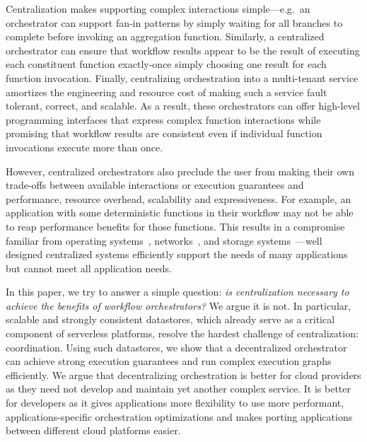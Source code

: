 Centralization makes supporting complex interactions simple---e.g.\ an
orchestrator can support fan-in patterns by simply waiting for all branches to
complete before invoking an aggregation function. Similarly, a centralized
orchestrator can ensure that workflow results appear to be the result of
executing each constituent function exactly-once simply choosing one result for
each function invocation. Finally, centralizing orchestration into a
multi-tenant service amortizes the engineering and resource cost of making such
a service fault tolerant, correct, and scalable. As a result, these
orchestrators can offer high-level programming interfaces that express complex
function interactions while promising that workflow results are consistent even
if individual function invocations execute more than once.


However, centralized orchestrators also preclude the user from making their own
trade-offs between available interactions or execution guarantees and
performance, resource overhead, scalability and expressiveness. For example, an
application with some deterministic functions in their workflow may not be able
to reap performance benefits for those functions. This results in a compromise
familiar from operating systems~\cite{exokernel,spin},
networks~\cite{active-networks,sdn}, and storage
systems~\cite{comet,splinter}---well designed centralized systems efficiently
support the needs of many applications but cannot meet all application needs.
%

In this paper, we try to answer a simple question: \textit{is centralization
\emph{necessary} to achieve the benefits of workflow  orchestrators?} We argue
it is not. In particular, scalable and strongly consistent datastores, which already serve as a critical component of serverless platforms, resolve the hardest
challenge of centralization: coordination. Using such datastores, we show that a
decentralized orchestrator can achieve strong execution guarantees and run
complex execution graphs efficiently. We argue that decentralizing orchestration
is better for cloud providers as they need not develop and maintain yet another
complex service. It is better for developers as it gives applications more
flexibility to use more performant, applications-specific orchestration
optimizations and makes porting applications between different cloud platforms
easier.

